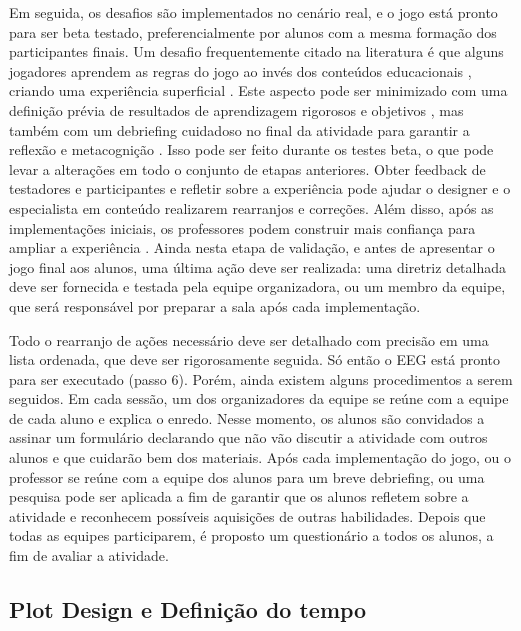 Em seguida, os desafios são implementados no cenário real, e o jogo está pronto para ser beta testado, preferencialmente por alunos com a mesma formação dos participantes finais. Um desafio frequentemente citado na literatura é que alguns jogadores aprendem as regras do jogo ao invés dos conteúdos educacionais \citep{sanchez_teaching_2019}, criando uma experiência superficial \citep{nicholson_creating_2018}. Este aspecto pode ser minimizado com uma definição prévia de resultados de aprendizagem rigorosos e objetivos \citep{waldrop_science_2015}, mas também com um debriefing cuidadoso no final da atividade para garantir a reflexão e metacognição \citep{sanchez_teaching_2019}. Isso pode ser feito durante os testes beta, o que pode levar a alterações em todo o conjunto de etapas anteriores. Obter feedback de testadores e participantes e refletir sobre a experiência pode ajudar o designer e o especialista em conteúdo realizarem rearranjos e correções. Além disso, após as implementações iniciais, os professores podem construir mais confiança para ampliar a experiência \citep{borrego_room_2017}. Ainda nesta etapa de validação, e antes de apresentar o jogo final aos alunos, uma última ação deve ser realizada: uma diretriz detalhada deve ser fornecida e testada pela equipe organizadora, ou um membro da equipe, que será responsável por preparar a sala após cada implementação.

Todo o rearranjo de ações necessário deve ser detalhado com precisão em uma lista ordenada, que deve ser rigorosamente seguida. Só então o EEG está pronto para ser executado (passo 6). Porém, ainda existem alguns procedimentos a serem seguidos. Em cada sessão, um dos organizadores da equipe se reúne com a equipe de cada aluno e explica o enredo. Nesse momento, os alunos são convidados a assinar um formulário declarando que não vão discutir a atividade com outros alunos e que cuidarão bem dos materiais. Após cada implementação do jogo, ou o professor se reúne com a equipe dos alunos para um breve debriefing, ou uma pesquisa pode ser aplicada a fim de garantir que os alunos refletem sobre a atividade e reconhecem possíveis aquisições de outras habilidades. Depois que todas as equipes participarem, é proposto um questionário a todos os alunos, a fim de avaliar a atividade.

\subsection{Plot Design e Definição do tempo}

